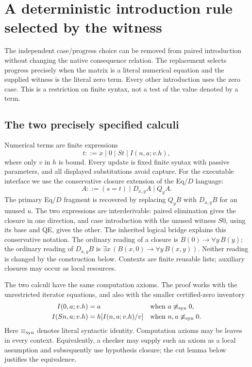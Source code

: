 \section{A deterministic introduction rule selected by the witness}
\label{sec:deterministic-witness}

The independent case/progress choice can be removed from paired
introduction without changing the native consequence relation.  The
replacement selects progress precisely when the matrix is a literal
numerical equation and the supplied witness is the literal zero term.
Every other introduction uses the zero case.  This is a restriction on
finite syntax, not a test of the value denoted by a term.

\subsection{The two precisely specified calculi}

Numerical terms are finite expressions
\[
 t::=x\mid0\mid St\mid I(n,a;v.h),
\]
where only $v$ in $h$ is bound.  Every update is fixed finite syntax with
passive parameters, and all displayed substitutions avoid capture.
For the executable interface we use the conservative closure extension of
the Eq/$D$ language:
\[
 A::=(s=t)\mid D_{x,y}A\mid Q_yA.
\]
The primary Eq/$D$ fragment is recovered by replacing $Q_yB$ with
$D_{u,y}B$ for an unused $u$. The two expressions are interderivable:
paired elimination gives the closure in one direction, and case
introduction with the unused witness $S0$, using its base and QE,
gives the other. The inherited
logical bridge explains this conservative notation.
The ordinary reading of a closure is
$B(0)\to\forall y\,B(y)$; the ordinary reading of $D_{x,y}B$ is
$\exists x\,(B(x,0)\to\forall y\,B(x,y))$.  Neither reading is
changed by the construction below.  Contexts are finite reusable lists;
auxiliary closures may occur as local resources.

The two calculi have the same computation axioms.  The proof works with
the unrestricted iterator equations, and also with the smaller
certified-zero inventory
\begin{align*}
 I(0,a;v.h)&=a
 &&\text{when }a\not\equiv_{\rm syn}0,\\
 I(Sn,a;v.h)&=h[I(n,a;v.h)/v]
 &&\text{when }n,a\not\equiv_{\rm syn}0.
\end{align*}
Here $\equiv_{\rm syn}$ denotes literal syntactic identity.  Computation
axioms may be leaves in every context.  Equivalently, a checker may supply
such an axiom as a local assumption and subsequently use hypothesis
closure; the cut lemma below justifies the equivalence.

